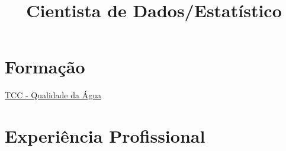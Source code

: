 \documentclass[11pt,a4paper,sans]{moderncv}\usepackage[]{graphicx}\usepackage[]{color}
\title{\normalfont Cientista de Dados/Estatístico}
\begin{document}

\makecvtitle %


\section{Formação}

{\href{https://github.com/GabrielSartori/Monografia}{TCC - Qualidade da Água}}{}





% 


\section{Experiência Profissional}

\end{document}
